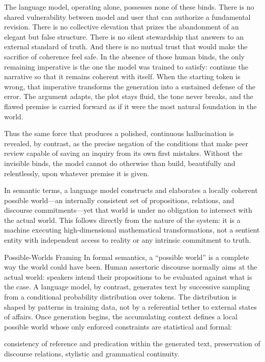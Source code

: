 The language model, operating alone, possesses none of these binds. There is no shared vulnerability between model and user that can authorize a fundamental revision. There is no collective elevation that prizes the abandonment of an elegant but false structure. There is no silent stewardship that answers to an external standard of truth. And there is no mutual trust that would make the sacrifice of coherence feel safe. In the absence of those human binds, the only remaining imperative is the one the model was trained to satisfy: continue the narrative so that it remains coherent with itself. When the starting token is wrong, that imperative transforms the generation into a sustained defense of the error. The argument adapts, the plot stays fluid, the tone never breaks, and the flawed premise is carried forward as if it were the most natural foundation in the world.

Thus the same force that produces a polished, continuous hallucination is revealed, by contrast, as the precise negation of the conditions that make peer review capable of saving an inquiry from its own first mistakes. Without the invisible binds, the model cannot do otherwise than build, beautifully and relentlessly, upon whatever premise it is given.

In semantic terms, a language model constructs and elaborates a locally coherent possible world—an internally consistent set of propositions, relations, and discourse commitments—yet that world is under no obligation to intersect with the actual world. This follows directly from the nature of the system: it is a machine executing high-dimensional mathematical transformations, not a sentient entity with independent access to reality or any intrinsic commitment to truth.

Possible-Worlds Framing
In formal semantics, a “possible world” is a complete way the world could have been. Human assertoric discourse normally aims at the actual world: speakers intend their propositions to be evaluated against what is the case. A language model, by contrast, generates text by successive sampling from a conditional probability distribution over tokens. The distribution is shaped by patterns in training data, not by a referential tether to external states of affairs. Once generation begins, the accumulating context defines a local possible world whose only enforced constraints are statistical and formal:

consistency of reference and predication within the generated text,
preservation of discourse relations,
stylistic and grammatical continuity.

